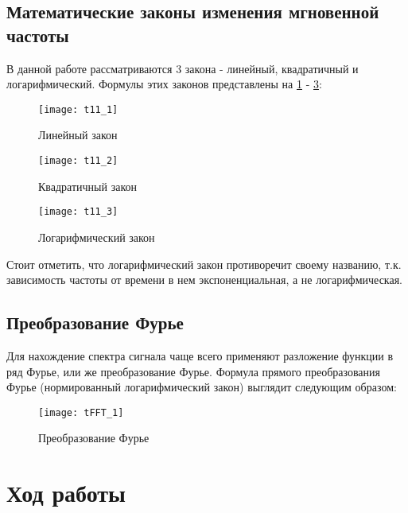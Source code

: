 \subsection{Математические законы изменения мгновенной частоты}
В данной работе рассматриваются 3 закона - линейный, квадратичный и логарифмический. Формулы этих законов представлены на \ref{pic:t11_1} - \ref{pic:t11_3}:
\begin{figure}[H]
	\begin{center}
		\texttt{[image: t11\_1]}
		\caption{Линейный закон} 
		\label{pic:t11_1} %
	\end{center}
\end{figure}
\begin{figure}[H]
	\begin{center}
		\texttt{[image: t11\_2]}
		\caption{Квадратичный закон} 
		\label{pic:t11_2} %
	\end{center}
\end{figure}
\begin{figure}[H]
	\begin{center}
		\texttt{[image: t11\_3]}
		\caption{Логарифмический закон} 
		\label{pic:t11_3} %
	\end{center}
\end{figure}
Стоит отметить, что логарифмический закон противоречит своему названию, т.к. зависимость частоты от времени в нем экспоненциальная, а не логарифмическая.

\subsection{Преобразование Фурье}
Для нахождение спектра сигнала чаще всего применяют разложение функции в ряд Фурье, или же преобразование Фурье.
Формула прямого преобразования Фурье (нормированный логарифмический закон) выглядит следующим образом:
\begin{figure}[H]
	\begin{center}
		\texttt{[image: tFFT\_1]}
		\caption{Преобразование Фурье} 
		\label{pic:tFFT_1} %
	\end{center}
\end{figure}



\section{Ход работы}

